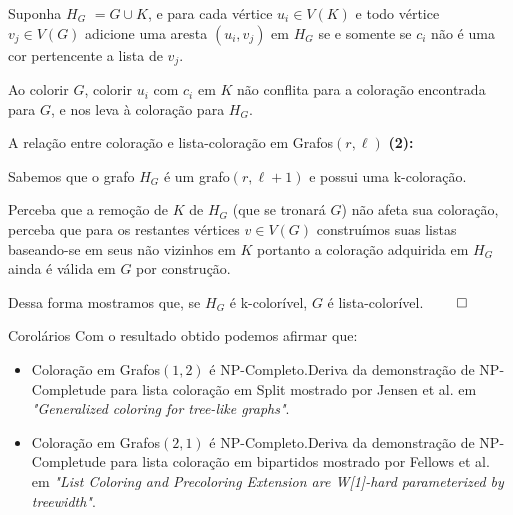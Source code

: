 \documentclass[9pt, compress]{beamer}
\newcommand{\?}{\textcolor{warn}{\textit{?}}}
\begin{document}
    \begin{frame}  
      Suponha $H_G$ $= G \cup K$, e para cada vértice $u_i \in V(K)$ e todo vértice $v_j \in V(G)$ adicione uma aresta $(u_i,v_j) $ em $H_G$ se e somente se $c_i$ não é uma cor pertencente a lista de $v_j$.
      \begin{center}
        \begin{figure}
        
      \end{figure}
      \end{center}   
      Ao colorir $G$, colorir $u_i$ com $c_i$ em $K$ não conflita para a coloração encontrada para $G$, e nos leva à coloração para $H_G$. 
    \end{frame}
    \begin{frame}{A relação entre coloração e lista-coloração em Grafos$(r,\ell)$}
      \textbf{(2):}
      
      Sabemos que o grafo $H_G$ é um grafo$(r,\ell+1)$ e possui uma k-coloração.
      
      Perceba que a remoção de $K$ de $H_G$ (que se tronará $G$) não afeta sua coloração, perceba que para os restantes vértices $v \in V(G)$ construímos suas listas baseando-se em seus não vizinhos em $K$ portanto a coloração adquirida em $H_G$ ainda é válida em $G$ por construção.
      
      Dessa forma mostramos que, se $H_G$ é k-colorível, $G$ é lista-colorível.
      $\qed$
    \end{frame}
    \begin{frame}{Corolários}
      Com o resultado obtido podemos afirmar que:
      \begin{itemize}
        \item Coloração em Grafos$(1,2)$ é NP-Completo.\newline Deriva da demonstração de NP-Completude para lista coloração em Split mostrado por Jensen et al. em \textit{"Generalized coloring for tree-like graphs"}.
        \item Coloração em Grafos$(2,1)$ é NP-Completo.\newline Deriva da demonstração de NP-Completude para lista coloração em bipartidos mostrado por Fellows et al. em \textit{"List Coloring and Precoloring Extension are W[1]-hard parameterized by treewidth"}.
      \end{itemize}
    \end{frame}
        
\end{document}

